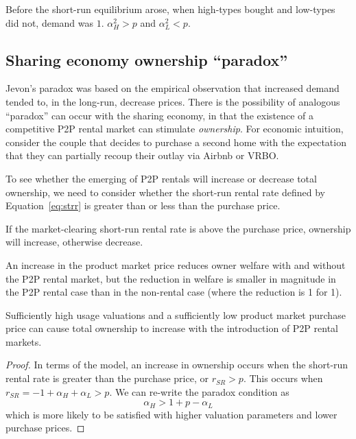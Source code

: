 \documentclass[11pt]{article}
\begin{document}
Before the short-run equilibrium arose, when high-types bought and low-types did not, demand was $1$. 
$\alpha_H^2 > p$ and $\alpha_L^2 < p$. 

\subsection{Sharing economy ownership ``paradox''} 
Jevon's paradox was based on the empirical observation that increased demand tended to, in the long-run, decrease prices. 
There is the possibility of analogous ``paradox'' can occur with the sharing economy, in that the existence of a competitive P2P rental market can stimulate \emph{ownership}.   
For economic intuition, consider the couple that decides to purchase a second home with the expectation that they can partially recoup their outlay via Airbnb or VRBO. 

To see whether the emerging of P2P rentals will increase or decrease total ownership, we need to consider whether the short-run rental rate defined by Equation~\ref{eq:strr} is greater than or less than the purchase price. 

\begin{prop}
If the market-clearing short-run rental rate is above the purchase price, ownership will increase, otherwise decrease. 
\end{prop} 

\begin{prop}
An increase in the product market price reduces owner welfare with and without the P2P rental market, but the reduction in welfare is smaller in magnitude in the P2P rental case than in the non-rental case (where the reduction is 1 for 1). 
\end{prop}
 
\begin{prop} \label{prop:paradox} 
Sufficiently high usage valuations and a sufficiently low product market purchase price can cause total ownership to increase with the introduction of P2P rental markets.  
\end{prop} 
\begin{proof}
In terms of the model, an increase in ownership occurs when the short-run rental rate is greater than the purchase price, or $r_{SR} > p$. 
This occurs when $r_{SR} = -1 + \alpha_H + \alpha_L > p$. 
We can re-write the paradox condition as  
\begin{equation} 
\alpha_H > 1 + p - \alpha_L  
\end{equation}
which is more likely to be satisfied with higher valuation parameters and lower purchase prices.   
\end{proof} 
\end{document}
